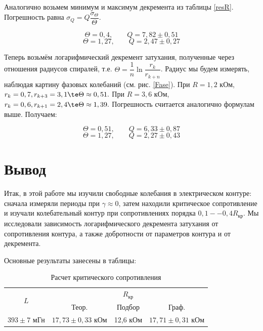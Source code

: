 \documentclass[12pt]{kiarticle} %
\begin{document}
Аналогично возьмем минимум и максимум декремента из таблицы \ref{resR}. Погрешность равна $ \sigma_Q = Q \dfrac{\sigma_\Theta}{\Theta} $. 

\begin{equation}\label{}
\Theta = 0,4 ,\qquad Q = 7,82 \pm 0,51
\end{equation}
\begin{equation}\label{}
\Theta = 1,27 ,\qquad Q = 2,47 \pm 0,27
\end{equation}

Теперь возьмём логарифмический декремент затухания, полученные через отношения радиусов спиралей, т.е. $ \Theta =  \dfrac{1}{n} \ln \dfrac{r_k}{r_{k+n}}$. Радиус мы будем измерять, наблюдая картину фазовых колебаний (см. рис. \ref{Fase}). При $ R = 1,2  $ кОм, $ r_k = 0,7, r_{k+3} = 3,1 \te \Theta \approx 0,51. $ При $ R = 3,6  $ кОм, $ r_k = 0,6, r_{k+1} = 2,4 \te \Theta \approx 1,39.$ Погрешность считается аналогично формулам выше. Получаем:

\begin{equation}\label{}
\Theta = 0,51 ,\qquad Q = 6,33 \pm 0,87
\end{equation}
\begin{equation}\label{}
\Theta = 1,27 ,\qquad Q = 2,27 \pm 0,43
\end{equation}


\section{Вывод}

Итак, в этой работе мы изучили свободные колебания в электрическом контуре: сначала измеряли периоды при $ \gamma \approx 0 $, затем находили критическое сопротивление и изучали колебательный контур при сопротивлениях порядка $ 0,1 -- 0,4 R_{кр} $. Мы исследовали зависимость логарифмического декремента затухания от сопротивления контура, а также добротности от параметров контура и от декремента. 

Основные результаты занесены в таблицы:
\begin{table}[h!]%
	\centering
	\caption{Расчет критического сопротивления }
	\begin{tabular}{|c|c|c|c|}
		\hline
		\multirow{2}{*}{$  L $} & \multicolumn{3}{|c|}{$ R_{кр} $} \\
		\cline{2-4}
		& Теор. & Подбор & Граф.  \\
		\hline
		$ 393 \pm  7 $ мГн   & $ 17,73 \pm 0,33 $ кОм & 12,6 кОм & 	$ 17,71 \pm 0,31 $ кОм \\
		\hline
	\end{tabular}
\end{table}
\end{document}
